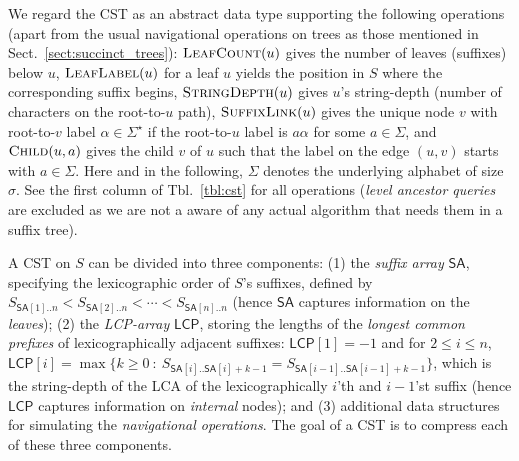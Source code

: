 \documentclass[11pt,onecolumn,final]{article} \usepackage{a4}
\newcommand{\LCP}[0]{\mathsf{LCP}}
\newcommand{\SUF}[0]{\mathsf{SA}}
\newcommand{\SF}[1]{S_{\SUF[#1]..n}}
\newcommand{\locate}{\ensuremath{\textsc{LeafLabel}}}
\newcommand{\sdepth}{\ensuremath{\textsc{StringDepth}}}
\newcommand{\scount}{\ensuremath{\textsc{LeafCount}}}
\newcommand{\child}{\ensuremath{\textsc{Child}}}
\newcommand{\slink}{\ensuremath{\textsc{SuffixLink}}}
\theoremstyle{plain}
\theoremstyle{remark}
\begin{document}
We regard the CST as an abstract data type supporting the following operations (apart from the usual navigational operations on trees as those mentioned in Sect.~\ref{sect:succinct_trees}): $\scount(u)$ gives the number of leaves (suffixes) below $u$, $\locate(u)$ for a leaf $u$ yields the position in $S$ where the corresponding suffix begins, $\sdepth(u)$ gives $u$'s string-depth (number of characters on the root-to-$u$ path), $\slink(u)$ gives the unique node $v$ with root-to-$v$ label $\alpha \in \Sigma^\star$ if the root-to-$u$ label is $a\alpha$ for some $a \in \Sigma$, and $\child(u,a)$ gives the child $v$ of $u$ such that the label on the edge $(u,v)$ starts with $a\in\Sigma$. Here and in the following, $\Sigma$ denotes the underlying alphabet of size $\sigma$. See the first column of Tbl.~\ref{tbl:cst} for all operations (\emph{level ancestor queries} are excluded as we are not a aware of any actual algorithm that needs them in a suffix tree).

A CST on $S$ can be divided into three components: (1) the \emph{suffix array} $\SUF$, specifying the lexicographic order of $S$'s suffixes, defined by $\SF{1} < \SF{2} < \cdots < \SF{n}$ (hence $\SUF$ captures information on the \emph{leaves}); (2) the \emph{LCP-array} $\LCP$, storing the lengths of the \emph{longest common prefixes} of lexicographically adjacent suffixes: $\LCP[1] = -1$ and for $2\leq i \le n$, $\LCP[i] = \max\{k \ge 0~:~S_{\SUF[i]..\SUF[i]+k-1}=S_{\SUF[i-1]..\SUF[i-1]+k-1}\}$, which is the string-depth of the LCA of the lexicographically $i$'th and $i-1$'st suffix (hence $\LCP$ captures information on \emph{internal} nodes); and (3) additional data structures for simulating the \emph{navigational operations}. The goal of a CST is to compress each of these three components.
\end{document}
